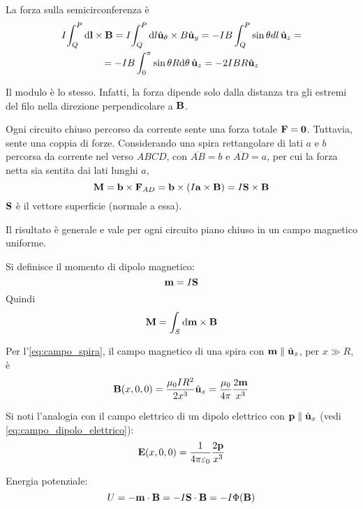 La forza sulla semicirconferenza è
\begin{equation}
\begin{gathered}
    I \!\int_Q^P \mathrm{d} \mathbf{l} \times \mathbf{B}
    = I \!\int_Q^P \mathrm{d} l \hat{\mathbf{u}}_{\theta} \times B \hat{\mathbf{u}}_{y}
    = -IB \int_Q^P \sin\theta dl \, \hat{\mathbf{u}}_{z} = \\
    = -IB \int_0^\pi \sin\theta R \mathrm{d} \theta \, \hat{\mathbf{u}}_{z}
    = -2IBR \hat{\mathbf{u}}_{z}
\end{gathered}
\end{equation}

Il modulo è lo stesso.
Infatti, la forza dipende solo dalla distanza tra gli estremi del filo nella direzione perpendicolare a $\mathbf{B}$.

Ogni circuito chiuso percorso da corrente sente una forza totale $\mathbf{F} = \mathbf{0}$.
Tuttavia, sente una coppia di forze.
Considerando una spira rettangolare di lati $a$ e $b$ percorsa da corrente nel verso $ABCD$, con $\overline{AB} = b$ e $\overline{AD} = a$, per cui la forza netta sia sentita dai lati lunghi $a$,
\begin{equation}
    \mathbf{M} = \mathbf{b} \times \mathbf{F}_{AD} = \mathbf{b} \times \left( I\mathbf{a}  \times \mathbf{B} \right)
    = I \mathbf{S} \times \mathbf{B}
\end{equation}
$\mathbf{S}$ è il vettore superficie (normale a essa).

Il risultato è generale e vale per ogni circuito piano chiuso in un campo magnetico uniforme.

Si definisce il momento di dipolo magnetico:
\begin{equation}
    \mathbf{m} = I \mathbf{S}
\end{equation}
Quindi
\begin{equation}
    \mathbf{M} = \int_S \mathrm{d}\mathbf{m} \times \mathbf{B}
\end{equation}

Per l'\cref{eq:campo_spira}, il campo magnetico di una spira con $\mathbf{m} \parallel \hat{\mathbf{u}}_{x}$, per $x \gg R$, è
\begin{equation}
    \mathbf{B}(x, 0, 0) = \frac{\mu_0 I R^2}{2 x^3} \hat{\mathbf{u}}_{x} = \frac{\mu_0}{4\pi} \frac{2\mathbf{m}}{x^3}
\end{equation}

Si noti l'analogia con il campo elettrico di un dipolo elettrico con $\mathbf{p} \parallel \hat{\mathbf{u}}_{x}$ (vedi \cref{eq:campo_dipolo_elettrico}):
\begin{equation}
    \mathbf{E}(x, 0, 0) = \frac{1}{4\pi\varepsilon_0} \frac{2\mathbf{p}}{x^3}
\end{equation}

Energia potenziale:
\begin{equation}
    U = - \mathbf{m} \cdot \mathbf{B} = - I \mathbf{S} \cdot \mathbf{B} = -I \Phi(\mathbf{B})
\end{equation}


